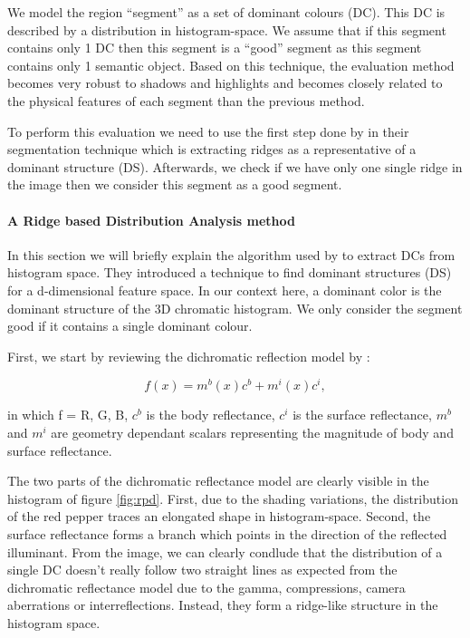 \documentclass[twoside,11pt]{article}
\begin{document}
We model the region ``segment'' as a set of dominant colours (DC). This DC is
described by a distribution in histogram-space. We assume that if this segment
contains only 1 DC then this segment is a ``good'' segment as this segment
contains only 1 semantic object.
Based on this technique, the evaluation method becomes very robust to shadows
and highlights and becomes closely related to the physical features of each
segment than the previous method.

To perform this evaluation we need to use the first step done by \cite{1478239}
in their segmentation technique which is extracting ridges as a representative
of a dominant structure (DS). Afterwards, we check if we have only one single
ridge in the image then we consider this segment as a good segment.

\paragraph{A Ridge based Distribution Analysis method}

In this section we will briefly explain the algorithm used by \cite{1478239} to
extract DCs from histogram space. They introduced a technique to find dominant
structures (DS) for a d-dimensional feature space. In our context here, a
dominant color is the dominant structure of the 3D chromatic histogram. We only
consider the segment good if it contains a single dominant colour.

First, we start by reviewing the dichromatic reflection model by \cite{136817}:

\begin{equation}
f(x) = m^{b}(x)c^{b} + m^{i}(x)c^{i},
\end{equation}

in which f = {R, G, B}, $c^{b}$ is the body reflectance, $c^{i}$ is the surface
reflectance, $m^{b}$ and $m^{i}$ are geometry dependant scalars representing the
magnitude of body and surface reflectance.

The two parts of the dichromatic reflectance model are clearly visible in the
histogram of figure \ref{fig:rpd}. First, due to the shading variations, the
distribution of the red pepper traces an elongated shape in histogram-space.
Second, the surface reflectance forms a branch which points in the direction of the reflected
illuminant. From the image, we can clearly condlude that the distribution of a
single DC doesn't really follow two straight lines as expected from the
dichromatic reflectance model due to the gamma, compressions, camera aberrations
or interreflections. Instead, they form a ridge-like structure in the histogram
space.
\end{document}
